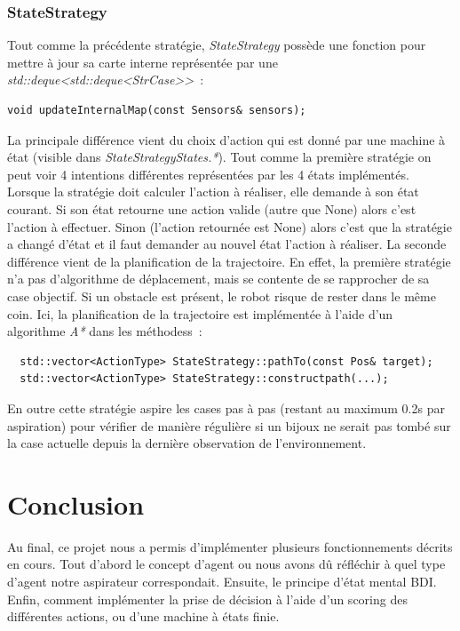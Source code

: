 \documentclass{article}
\begin{document}
\subsubsection{StateStrategy}

Tout comme la précédente stratégie, \emph{StateStrategy} possède une fonction pour mettre à jour sa carte interne représentée par une \emph{std::deque<std::deque<StrCase>>}~:
\begin{verbatim}
void updateInternalMap(const Sensors& sensors);
\end{verbatim}
La principale différence vient du choix d'action qui est donné par une machine à
état (visible dans \emph{StateStrategyStates.*}). Tout comme la première
stratégie on peut voir 4 intentions différentes représentées par les 4 états
implémentés. Lorsque la stratégie doit calculer l'action à réaliser, elle
demande à son état courant. Si son état retourne une action valide (autre que
None) alors c'est l'action à effectuer. Sinon (l'action retournée est None)
alors c'est que la stratégie a changé d'état et il faut demander au nouvel état
l'action à réaliser.
La seconde différence vient de la planification de la trajectoire. En effet, la
première stratégie n'a pas d'algorithme de déplacement, mais se contente de se
rapprocher de sa case objectif. Si un obstacle est présent, le robot risque de
rester dans le même coin. Ici, la planification de la trajectoire est
implémentée à l'aide d'un algorithme \emph{A*} dans les méthodess~:
\begin{verbatim}
  std::vector<ActionType> StateStrategy::pathTo(const Pos& target);
  std::vector<ActionType> StateStrategy::constructpath(...);
\end{verbatim}

En outre cette stratégie aspire les cases pas à pas (restant au maximum 0.2s par
aspiration) pour vérifier de manière régulière si un bijoux ne serait pas tombé
sur la case actuelle depuis la dernière observation de l'environnement.


\section{Conclusion}
Au final, ce projet nous a permis d'implémenter plusieurs fonctionnements
décrits en cours. Tout d'abord le concept d'agent ou nous avons dû réfléchir à
quel type d'agent notre aspirateur correspondait. Ensuite, le principe d'état
mental BDI. Enfin, comment implémenter la prise de décision à l'aide d'un
scoring des différentes actions, ou d'une machine à états finie.
\end{document}
